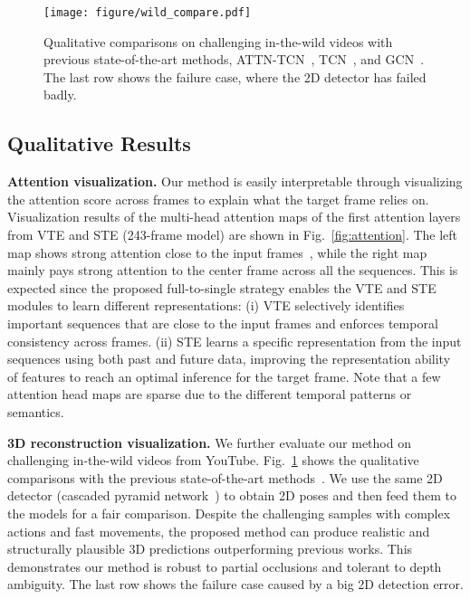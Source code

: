 \documentclass[journal]{IEEEtran}
\begin{document}
\begin{figure}[htb]
   \centering
   \texttt{[image: figure/wild\_compare.pdf]}
   \caption
   {
      Qualitative comparisons on challenging in-the-wild videos with previous state-of-the-art methods, ATTN-TCN~\cite{liu2020attention}, TCN~\cite{pavllo20193d}, and GCN~\cite{cai2019exploiting}.  
      The last row shows the failure case, where the 2D detector has failed badly. 
   }
   \label{fig:wild_compare}
\end{figure}

\subsection{Qualitative Results}
\textbf{Attention visualization.}
Our method is easily interpretable through visualizing the attention score across frames to explain what the target frame relies on. 
Visualization results of the multi-head attention maps of the first attention layers from VTE and STE (243-frame model) are shown in Fig.~\ref{fig:attention}. 
The left map shows strong attention close to the input frames~\cite{Wu2020LiteTransformer,jiang2020convbert}, while the right map mainly pays strong attention to the center frame across all the sequences. 
This is expected since the proposed full-to-single strategy enables the VTE and STE modules to learn different representations: 
(i) VTE selectively identifies important sequences that are close to the input frames and enforces temporal consistency across frames. 
(ii) STE learns a specific representation from the input sequences using both past and future data, improving the representation ability of features to reach an optimal inference for the target frame. 
Note that a few attention head maps are sparse due to the different temporal patterns or semantics. 

\textbf{3D reconstruction visualization.}
We further evaluate our method on challenging in-the-wild videos from YouTube. 
Fig.~\ref{fig:wild_compare} shows the qualitative comparisons with the previous state-of-the-art methods~\cite{liu2020attention,pavllo20193d,cai2019exploiting}. 
We use the same 2D detector (cascaded pyramid network~\cite{chen2018cascaded}) to obtain 2D poses and then feed them to the models for a fair comparison. 
Despite the challenging samples with
complex actions and fast movements, the proposed method can produce realistic and structurally plausible 3D predictions outperforming previous works. 
This demonstrates our method is robust to partial occlusions and tolerant to depth ambiguity. 
The last row shows the failure case caused by a big 2D detection error.
\end{document}
